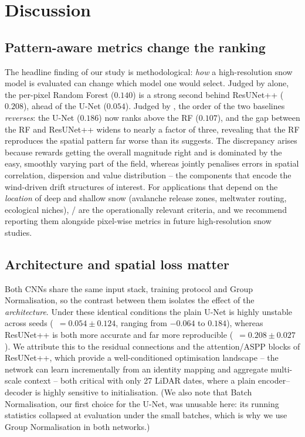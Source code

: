 \section{Discussion}
\label{sec:discussion}

\subsection{Pattern-aware metrics change the ranking}

The headline finding of our study is methodological: \emph{how} a
high-resolution snow model is evaluated can change which model one would
select. Judged by \Rsq{} alone, the per-pixel Random Forest ($0.140$) is a
strong second behind ResUNet++ ($0.208$), ahead of the U-Net ($0.054$). Judged
by \SPAEF{}, the order of the two baselines \emph{reverses}: the U-Net ($0.186$)
now ranks above the RF ($0.107$), and the gap between the RF and ResUNet++
widens to nearly a factor of three, revealing that the RF reproduces the spatial
pattern far worse than its \Rsq{} suggests. The discrepancy arises because
\Rsq{} rewards getting the
overall magnitude right and is dominated by the easy, smoothly varying part of
the field, whereas \SPAEF{} jointly penalises errors in spatial correlation,
dispersion and value distribution -- the components that encode the
wind-driven drift structures of interest. For applications that depend on the
\emph{location} of deep and shallow snow (avalanche release zones, meltwater
routing, ecological niches), \SPAEF{}/\MSPAEF{} are the operationally relevant
criteria, and we recommend reporting them alongside pixel-wise metrics in
future high-resolution snow studies.

\subsection{Architecture and spatial loss matter}

Both CNNs share the same input stack, training protocol and Group Normalisation,
so the contrast between them isolates the effect of the \emph{architecture}.
Under these identical conditions the plain U-Net is highly unstable across seeds
(\Rsq{}~$=0.054\pm0.124$, ranging from $-0.064$ to $0.184$), whereas ResUNet++ is
both more accurate and far more reproducible (\Rsq{}~$=0.208\pm0.027$). We
attribute this to the residual connections and the attention/ASPP blocks of
ResUNet++, which provide a well-conditioned optimisation landscape -- the network
can learn incrementally from an identity mapping and aggregate multi-scale
context -- both critical with only 27 LiDAR dates, where a plain encoder--decoder
is highly sensitive to initialisation. (We also note that Batch Normalisation,
our first choice for the U-Net, was unusable here: its running statistics
collapsed at evaluation under the small batches, which is why we use Group
Normalisation in both networks.)

